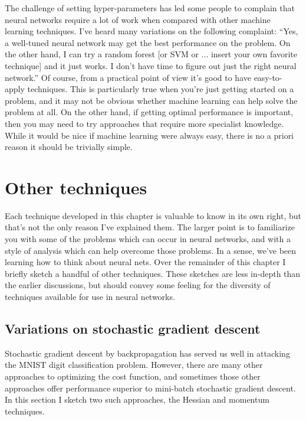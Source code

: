 \documentclass[a4paper,twoside,10pt]{book}
\begin{document}
The challenge of setting hyper-parameters has led some people to complain that neural networks require a lot of work when compared with other machine learning techniques. I've heard many variations on the following complaint: ``Yes, a well-tuned neural network may get the best performance on the problem. On the other hand, I can try a random forest [or SVM or ... insert your own favorite technique] and it just works. I don't have time to figure out just the right neural network.'' Of course, from a practical point of view it's good to have easy-to-apply techniques. This is particularly true when you're just getting started on a problem, and it may not be obvious whether machine learning can help solve the problem at all. On the other hand, if getting optimal performance is important, then you may need to try approaches that require more specialist knowledge. While it would be nice if machine learning were always easy, there is no a priori reason it should be trivially simple.

\section{Other techniques}
\label{sec:3.6}
Each technique developed in this chapter is valuable to know in its own right, but that's not the only reason I've explained them. The larger point is to familiarize you with some of the problems which can occur in neural networks, and with a style of analysis which can help overcome those problems. In a sense, we've been learning how to think about neural nets. Over the remainder of this chapter I briefly sketch a handful of other techniques. These sketches are less in-depth than the earlier discussions, but should convey some feeling for the diversity of techniques available for use in neural networks.

\subsection{Variations on stochastic gradient descent}
\label{sec:3.6.1}
Stochastic gradient descent by backpropagation has served us well in attacking the MNIST digit classification problem. However, there are many other approaches to optimizing the cost function, and sometimes those other approaches offer performance superior to mini-batch stochastic gradient descent. In this section I sketch two such approaches, the Hessian and momentum techniques.
\end{document}
